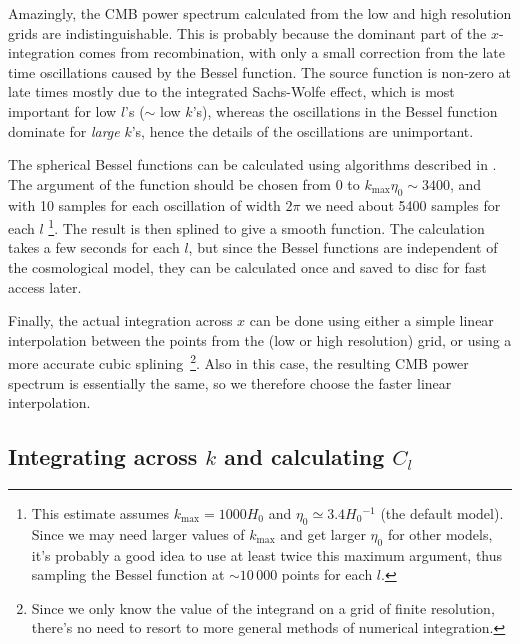 \documentclass[twocolumn,nofootinbib,amsmath,amssymb]{revtex4}
\begin{document}
Amazingly, the CMB power spectrum calculated from the low and high resolution
grids are indistinguishable. This is probably because the dominant part of the
$x$-integration comes from recombination, with only a small correction from the
late time oscillations caused by the Bessel function. The source function is
non-zero at late times mostly due to the integrated Sachs-Wolfe effect, which
is most important for low $l$'s ($\sim$ low $k$'s), whereas the oscillations in
the Bessel function dominate for \textit{large} $k$'s, hence the details of the
oscillations are unimportant.

The spherical Bessel functions can be calculated using algorithms described in
\cite{NumRec}. The argument of the function should be chosen from 0 to
$k_{\max} \eta_0 \sim 3400$, and with 10 samples for each oscillation of width
$2\pi$ we need about 5400 samples for each $l$ \footnote{This estimate assumes
$k_{\max} = 1000 H_0$ and $\eta_0 \simeq 3.4 {H_0}\!{}^{-1}$ (the default
model). Since we may need larger values of $k_{\max}$ and get larger $\eta_0$
for other models, it's probably a good idea to use at least twice this maximum
argument, thus sampling the Bessel function at $\sim 10\,000$ points for each
$l$.}. The result is then splined to give a smooth function. The calculation
takes a few seconds for each $l$, but since the Bessel functions are
independent of the cosmological model, they can be calculated once and saved to
disc for fast access later.

Finally, the actual integration across $x$ can be done using either a simple
linear interpolation between the points from the (low or high resolution) grid,
or using a more accurate cubic splining~\footnote{Since we only know the value
of the integrand on a grid of finite resolution, there's no need to resort to
more general methods of numerical integration.}. Also in this case, the
resulting CMB power spectrum is essentially the same, so we therefore choose
the faster linear interpolation.


\subsection{Integrating across $k$ and calculating $C_l$}
\label{cha:kintegration}
\end{document}
